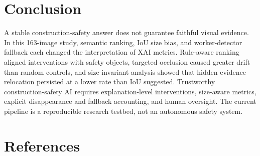 \documentclass[12pt,letterpaper,twoside]{article}
\begin{document}
\section{Conclusion}

A stable construction-safety answer does not guarantee faithful visual evidence. In this 163-image study, semantic ranking, IoU size bias, and worker-detector fallback each changed the interpretation of XAI metrics. Rule-aware ranking aligned interventions with safety objects, targeted occlusion caused greater drift than random controls, and size-invariant analysis showed that hidden evidence relocation persisted at a lower rate than IoU suggested. Trustworthy construction-safety AI requires explanation-level interventions, size-aware metrics, explicit disappearance and fallback accounting, and human oversight. The current pipeline is a reproducible research testbed, not an autonomous safety system.

\label{bodyend}
\clearpage
\section*{References}
\end{document}
